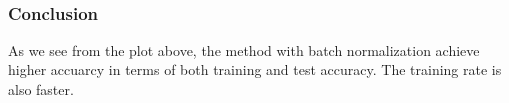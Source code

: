 \documentclass[11pt]{article}
\begin{document}
    \begin{center}
    \end{center}
    { \hspace*{\fill} \\}
    
    \hypertarget{conclusion}{%
\subsubsection{Conclusion}\label{conclusion}}

As we see from the plot above, the method with batch normalization
achieve higher accuarcy in terms of both training and test accuracy. The
training rate is also faster.


    
    
    
    
\end{document}
